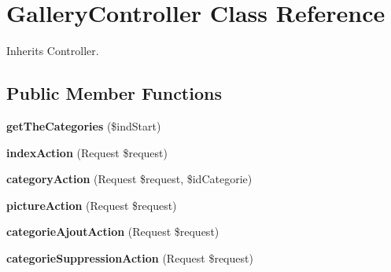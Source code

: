 \hypertarget{class_site_1_1_trail_bundle_1_1_controller_1_1_gallery_controller}{}\section{Gallery\+Controller Class Reference}
\label{class_site_1_1_trail_bundle_1_1_controller_1_1_gallery_controller}


Inherits Controller.

\subsection*{Public Member Functions}
\begin{DoxyCompactItemize}
\item 
\hypertarget{class_site_1_1_trail_bundle_1_1_controller_1_1_gallery_controller_ae4de1f5b4364e173918665c7dcabca12}{}{\bfseries get\+The\+Categories} (\$ind\+Start)\label{class_site_1_1_trail_bundle_1_1_controller_1_1_gallery_controller_ae4de1f5b4364e173918665c7dcabca12}

\item 
\hypertarget{class_site_1_1_trail_bundle_1_1_controller_1_1_gallery_controller_ad6baab2738493c17ffcbf45130e919d5}{}{\bfseries index\+Action} (Request \$request)\label{class_site_1_1_trail_bundle_1_1_controller_1_1_gallery_controller_ad6baab2738493c17ffcbf45130e919d5}

\item 
\hypertarget{class_site_1_1_trail_bundle_1_1_controller_1_1_gallery_controller_a1a667d090a4a535a4fd00ae38872819a}{}{\bfseries category\+Action} (Request \$request, \$id\+Categorie)\label{class_site_1_1_trail_bundle_1_1_controller_1_1_gallery_controller_a1a667d090a4a535a4fd00ae38872819a}

\item 
\hypertarget{class_site_1_1_trail_bundle_1_1_controller_1_1_gallery_controller_a89582a3b2e2a6466cfedc1a9fb74e356}{}{\bfseries picture\+Action} (Request \$request)\label{class_site_1_1_trail_bundle_1_1_controller_1_1_gallery_controller_a89582a3b2e2a6466cfedc1a9fb74e356}

\item 
\hypertarget{class_site_1_1_trail_bundle_1_1_controller_1_1_gallery_controller_a87ebad84297d2df0299a639135ebddfd}{}{\bfseries categorie\+Ajout\+Action} (Request \$request)\label{class_site_1_1_trail_bundle_1_1_controller_1_1_gallery_controller_a87ebad84297d2df0299a639135ebddfd}

\item 
\hypertarget{class_site_1_1_trail_bundle_1_1_controller_1_1_gallery_controller_a7ad1d02538c1220d102e9f44fb3db4cf}{}{\bfseries categorie\+Suppression\+Action} (Request \$request)\label{class_site_1_1_trail_bundle_1_1_controller_1_1_gallery_controller_a7ad1d02538c1220d102e9f44fb3db4cf}


\end{DoxyCompactItemize}
